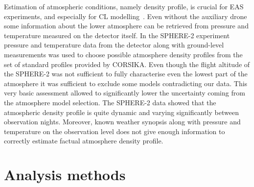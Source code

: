 \documentclass[a4paper,11pt]{article}
\begin{document}
Estimation of atmospheric conditions, namely density profile, is crucial for EAS experiments, and especially for CL modelling~\cite{Bernlhr2000}. Even without the auxiliary drone some information about the lower atmosphere can be retrieved from pressure and temperature measured on the detector itself. In the SPHERE-2 experiment pressure and temperature data from the detector along with ground-level measurements was used to choose possible atmosphere density profiles from the set of standard profiles provided by CORSIKA. Even though the flight altitude of the SPHERE-2 was not sufficient to fully characterise even the lowest part of the atmosphere it was sufficient to exclude some models contradicting our data. This very basic assessment allowed to significantly lower the uncertainty coming from the atmosphere model selection.%
 The SPHERE-2 data showed that the atmospheric density profile is quite dynamic and varying significantly between observation nights. Moreover, known weather synopsis along with pressure and temperature on the observation level does not give enough information to correctly estimate factual atmosphere density profile. %




\section{Analysis methods}
\end{document}
